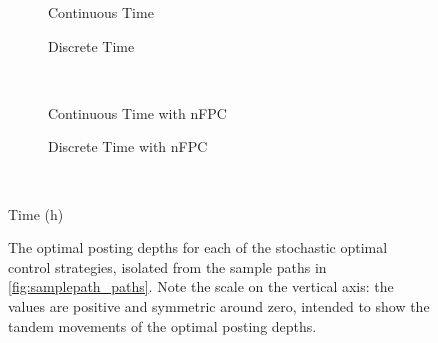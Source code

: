\begin{figure}%
\centering%
\begin{subfigure}[b]{.4\linewidth}%
  \centering%
  \setlength\figureheight{\linewidth}%
  \setlength\figurewidth{\linewidth}%
  \caption{Continuous Time}%
\end{subfigure}%
\hspace{1.5cm}%
\begin{subfigure}[b]{.4\linewidth}%
  \setlength\figureheight{\linewidth}%
  \setlength\figurewidth{\linewidth}%
  \caption{Discrete Time}%
\end{subfigure}\\%
\vspace{1cm}%
\begin{subfigure}[b]{.4\linewidth}%
  \setlength\figureheight{\linewidth}%
  \setlength\figurewidth{\linewidth}%
  \caption{Continuous Time with nFPC}%
\end{subfigure}%
\hspace{1.5cm}%
\begin{subfigure}[b]{.4\linewidth}%
  \setlength\figureheight{\linewidth}%
  \setlength\figurewidth{\linewidth}%
  \caption{Discrete Time with nFPC}%
\end{subfigure}\\%
\leavevmode{}\hspace{0pt plus 1filll}\null%

Time (h)

\vspace{1cm}%
  \caption[Comparison of optimal posting depths on the sample path]{The optimal posting depths for each of the stochastic optimal control strategies, isolated from the sample paths in \autoref{fig:samplepath_paths}. Note the scale on the vertical axis: the values are positive and symmetric around zero, intended to show the tandem movements of the optimal posting depths.}\label{fig:samplepath_depths}%
\end{figure}
